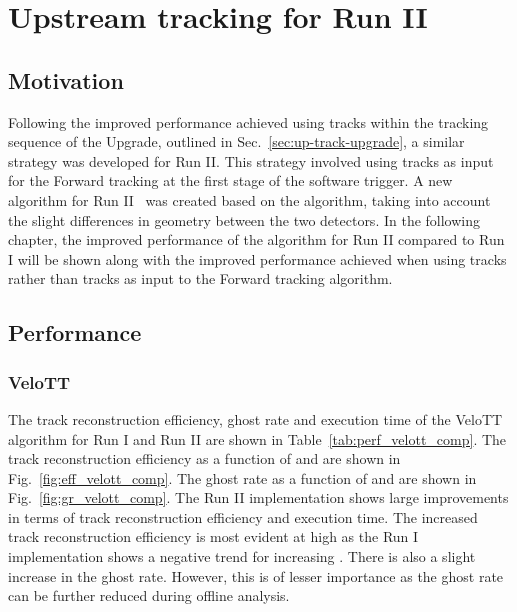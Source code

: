 \section{Upstream tracking for \lhcb Run II}
\label{sec:up-track-run2}

\subsection{Motivation}

Following the improved performance achieved using \velout tracks within the tracking sequence of the \lhcb Upgrade, outlined in Sec.~\ref{sec:up-track-upgrade}, a similar strategy was developed for \lhcb Run II. This strategy involved using \velott tracks as input for the Forward tracking at the first stage of the software trigger. A new \velott algorithm for Run II~\cite{velott} was created based on the \velout algorithm, taking into account the slight differences in geometry between the two detectors. In the following chapter, the improved performance of the \velott algorithm for Run II compared to Run I will be shown along with the improved performance achieved when using \velott tracks rather than \velo tracks as input to the Forward tracking algorithm.

\subsection{Performance}

\subsubsection{VeloTT}

The track reconstruction efficiency, ghost rate and execution time of the VeloTT algorithm for Run I and Run II are shown in Table~\ref{tab:perf_velott_comp}. The track reconstruction efficiency as a function of \ptot and \pt are shown in Fig.~\ref{fig:eff_velott_comp}. The ghost rate as a function of \ptot and \pt are shown in Fig.~\ref{fig:gr_velott_comp}. The Run II implementation shows large improvements in terms of track reconstruction efficiency and execution time. The increased track reconstruction efficiency is most evident at high \ptot as the Run I implementation shows a negative trend for increasing \ptot. There is also a slight increase in the ghost rate. However, this is of lesser importance as the ghost rate can be further reduced during offline analysis. 

